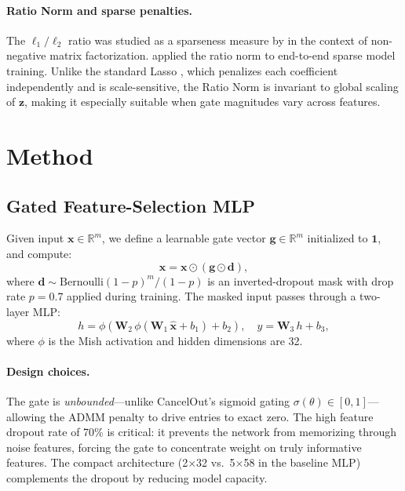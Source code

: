 \documentclass{uai2026} %
\theoremstyle{definition}
\theoremstyle{remark}
\newcommand{\bz}{\mathbf{z}}
\newcommand{\bg}{\mathbf{g}}
\newcommand{\bx}{\mathbf{x}}
\newcommand{\bW}{\mathbf{W}}
\begin{document}
\paragraph{Ratio Norm and sparse penalties.}
The $\ell_1/\ell_2$ ratio was studied as a sparseness measure by \citet{hoyer2004sparseness} in the context of non-negative matrix factorization.
\citet{nasery2024end} applied the ratio norm to end-to-end sparse model training.
Unlike the standard Lasso \citep{tibshirani1996lasso}, which penalizes each coefficient independently and is scale-sensitive, the Ratio Norm is invariant to global scaling of $\bz$, making it especially suitable when gate magnitudes vary across features.

\section{Method}\label{sec:method}

\subsection{Gated Feature-Selection MLP}\label{sec:model}

Given input $\bx \in \mathbb{R}^m$, we define a learnable gate vector $\bg \in \mathbb{R}^m$ initialized to $\mathbf{1}$, and compute:
\begin{equation}\label{eq:gating}
    \hat{\bx} = \bx \odot (\bg \odot \mathbf{d}),
\end{equation}
where $\mathbf{d} \sim \text{Bernoulli}(1 - p)^m / (1-p)$ is an inverted-dropout mask with drop rate $p = 0.7$ applied during training.
The masked input passes through a two-layer MLP:
\begin{equation}\label{eq:mlp}
    h = \phi(\bW_2\, \phi(\bW_1\, \hat{\bx} + b_1) + b_2), \quad y = \bW_3\, h + b_3,
\end{equation}
where $\phi$ is the Mish activation \citep{misra2019mish} and hidden dimensions are 32.

\paragraph{Design choices.}
The gate is \emph{unbounded}---unlike CancelOut's sigmoid gating $\sigma(\theta) \in [0,1]$---allowing the ADMM penalty to drive entries to exact zero.
The high feature dropout rate of 70\% is critical: it prevents the network from memorizing through noise features, forcing the gate to concentrate weight on truly informative features.
The compact architecture (2$\times$32 vs.\ 5$\times$58 in the baseline MLP) complements the dropout by reducing model capacity.
\end{document}
